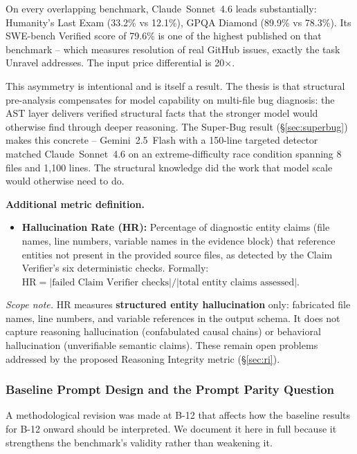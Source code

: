 \documentclass[12pt,a4paper]{article}
\begin{document}
\vspace{4pt}
On every overlapping benchmark, Claude~Sonnet~4.6 leads substantially: Humanity's Last
Exam (33.2\% vs 12.1\%), GPQA Diamond (89.9\% vs 78.3\%). Its SWE-bench Verified score
of 79.6\% is one of the highest published on that benchmark -- which measures resolution
of real GitHub issues, exactly the task Unravel addresses. The input price differential
is 20$\times$.

This asymmetry is intentional and is itself a result. The thesis is that structural
pre-analysis compensates for model capability on multi-file bug diagnosis: the AST layer
delivers verified structural facts that the stronger model would otherwise find through
deeper reasoning. The Super-Bug result (\S\ref{sec:superbug}) makes this concrete --
Gemini~2.5~Flash with a 150-line targeted detector matched Claude~Sonnet~4.6 on an
extreme-difficulty race condition spanning 8 files and 1,100 lines. The structural
knowledge did the work that model scale would otherwise need to do.

\textbf{Additional metric definition.}
\begin{itemize}
  \item \textbf{Hallucination Rate (HR):} Percentage of diagnostic entity claims
        (file names, line numbers, variable names in the evidence block) that reference
        entities not present in the provided source files, as detected by the Claim
        Verifier's six deterministic checks.
        Formally: $\text{HR} = |\text{failed Claim Verifier checks}| /
        |\text{total entity claims assessed}|$.
\end{itemize}

\begin{findingbox}
\textit{Scope note.} HR measures \textbf{structured entity hallucination} only: fabricated
file names, line numbers, and variable references in the output schema. It does not capture
reasoning hallucination (confabulated causal chains) or behavioral hallucination
(unverifiable semantic claims). These remain open problems addressed by the proposed
Reasoning Integrity metric (\S\ref{sec:ri}).
\end{findingbox}

\subsubsection{Baseline Prompt Design and the Prompt Parity Question}
\label{sec:prompt-parity}

A methodological revision was made at B-12 that affects how the baseline results for
B-12 onward should be interpreted. We document it here in full because it strengthens
the benchmark's validity rather than weakening it.
\end{document}
